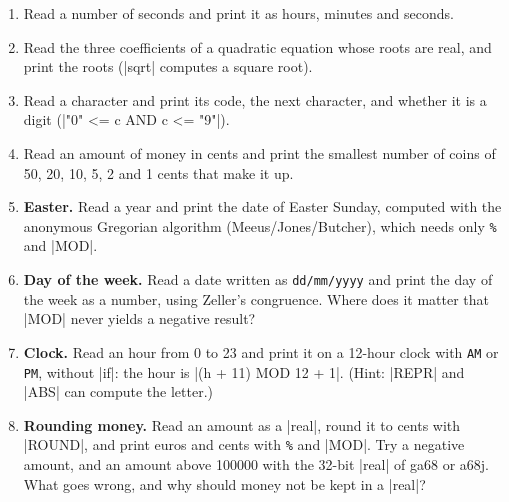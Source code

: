 \begin{enumerate}
\item Read a number of seconds and print it as hours, minutes and
  seconds.
\item Read the three coefficients of a quadratic equation whose roots
  are real, and print the roots (\code|sqrt| computes a square root).
\item Read a character and print its code, the next character, and
  whether it is a digit (\code|"0" <= c AND c <= "9"|).
\item Read an amount of money in cents and print the smallest number of
  coins of 50, 20, 10, 5, 2 and 1 cents that make it up.
\item \textbf{Easter.} Read a year and print the date of Easter Sunday,
  computed with the anonymous Gregorian algorithm (Meeus/Jones/Butcher),
  which needs only \texttt{\%} and \code|MOD|.
\item \textbf{Day of the week.} Read a date written as
  \texttt{dd/mm/yyyy} and print the day of the week as a number, using
  Zeller's congruence. Where does it matter that \code|MOD| never yields
  a negative result?
\item \textbf{Clock.} Read an hour from 0 to 23 and print it on a
  12-hour clock with \texttt{AM} or \texttt{PM}, without \code|if|: the
  hour is \code|(h + 11) MOD 12 + 1|. (Hint: \code|REPR| and
  \code|ABS| can compute the letter.)
\item \textbf{Rounding money.} Read an amount as a \code|real|, round it
  to cents with \code|ROUND|, and print euros and cents with \texttt{\%}
  and \code|MOD|. Try a negative amount, and an amount above 100000
  with the 32-bit \code|real| of ga68 or a68j. What goes wrong, and why
  should money not be kept in a \code|real|?
\end{enumerate}
